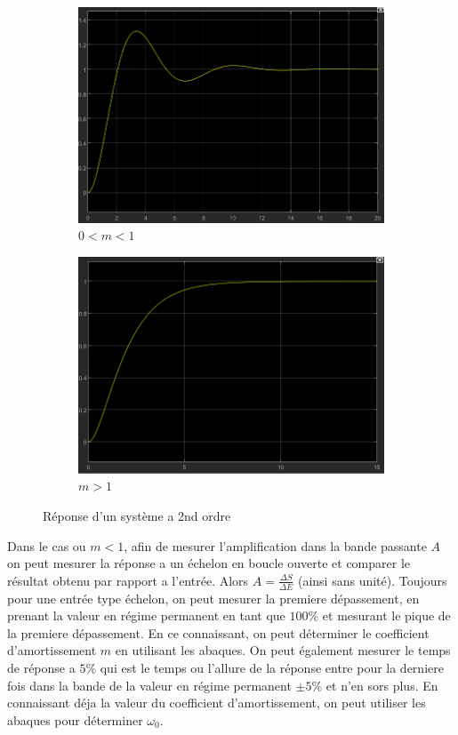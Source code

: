 \documentclass[12pt, a4paper]{report}
\begin{document}
\begin{figure}[h]
    \begin{subfigure}[h!]{0.4\linewidth}
    \includegraphics[width=\linewidth]{reponse2ndordresmallz.png}
    \caption{$0 < m < 1$}
    \end{subfigure}
    \hfill
    \begin{subfigure}[h!]{0.4\linewidth}
    \includegraphics[width=\linewidth]{reponse2ndordrebigz.png}
    \caption{$m > 1$}
    \end{subfigure}
    \caption{Réponse d'un système a 2nd ordre}
\end{figure}

Dans le cas ou $m < 1$, afin de mesurer l'amplification dans la bande passante $A$ on peut mesurer
la réponse a un échelon en boucle ouverte et comparer le résultat obtenu par rapport a l'entrée. Alors $A = \frac{\Delta S}{\Delta E}$ (ainsi sans unité).
Toujours pour une entrée type échelon, on peut mesurer la premiere dépassement, en prenant la valeur en régime permanent en tant que $100\%$ 
et mesurant le pique de la premiere dépassement. En ce connaissant, on peut déterminer le coefficient d'amortissement $m$ en utilisant les abaques.
On peut également mesurer le temps de réponse a $5\%$ qui est le temps ou l'allure de la réponse entre pour la derniere fois dans la bande
de la valeur en régime permanent $\pm 5\%$ et n'en sors plus. En connaissant déja la valeur du coefficient d'amortissement, on peut utiliser les abaques pour 
déterminer $\omega_0$.
\end{document}
